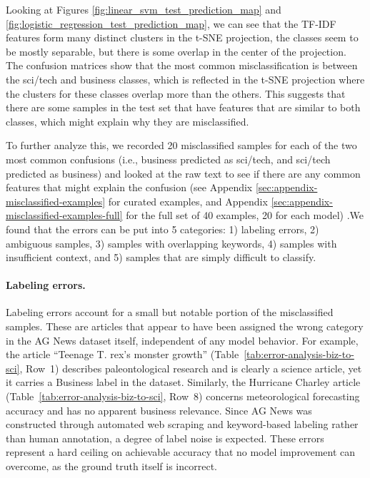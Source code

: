 
Looking at Figures \ref{fig:linear_svm_test_prediction_map} and \ref{fig:logistic_regression_test_prediction_map}, we can see that the TF-IDF features form many distinct clusters in the t-SNE projection, the classes seem to be mostly separable, but there is some overlap in the center of the projection. The confusion matrices show that the most common misclassification is between the sci/tech and business classes, which is reflected in the t-SNE projection where the clusters for these classes overlap more than the others. This suggests that there are some samples in the test set that have features that are similar to both classes, which might explain why they are misclassified.

To further analyze this, we recorded 20 misclassified samples for each of the two most common confusions (i.e., business predicted as sci/tech, and sci/tech predicted as business) and looked at the raw text to see if there are any common features that might explain the confusion (see Appendix \ref{sec:appendix-misclassified-examples} for curated examples, and Appendix \ref{sec:appendix-misclassified-examples-full} for the full set of 40 examples, 20 for each model) .We found that the errors can be put into 5 categories: 1) labeling errors, 2) ambiguous samples, 3) samples with overlapping keywords, 4) samples with insufficient context, and 5) samples that are simply difficult to classify.

\paragraph{Labeling errors.} Labeling errors account for a small but notable portion of the misclassified samples. These are articles that appear to have been assigned the wrong category in the AG News dataset itself, independent of any model behavior. For example, the article ``Teenage T. rex's monster growth'' (Table~\ref{tab:error-analysis-biz-to-sci}, Row~1) describes paleontological research and is clearly a science article, yet it carries a Business label in the dataset. Similarly, the Hurricane Charley article (Table~\ref{tab:error-analysis-biz-to-sci}, Row~8) concerns meteorological forecasting accuracy and has no apparent business relevance. Since AG News was constructed through automated web scraping and keyword-based labeling rather than human annotation, a degree of label noise is expected. These errors represent a hard ceiling on achievable accuracy that no model improvement can overcome, as the ground truth itself is incorrect.

